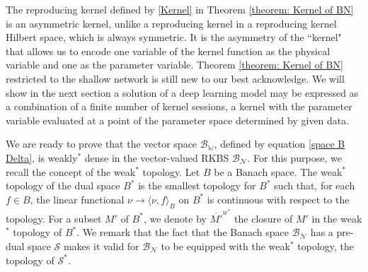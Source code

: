 \documentclass[11pt]{article}
\begin{document}
The reproducing kernel defined by \eqref{Kernel} in Theorem \ref{theorem: Kernel of BN} is an asymmetric kernel, unlike a reproducing kernel in a reproducing kernel Hilbert space, which is always symmetric. It is the asymmetry of the ``kernel" that allows us to encode one variable of the kernel function as the physical variable and one as the parameter variable. Theorem \ref{theorem: Kernel of BN} restricted to the shallow network is still new to our best acknowledge. We will show in the next section a solution of a deep learning model may be expressed as a combination of a finite number of kernel sessions, a kernel with the parameter variable evaluated at a point of the parameter space determined by given data.

We are ready to prove that the vector space $\mathcal{B}_{\mathbb{W}}$, defined by equation \eqref{space B Delta}, is weakly${}^*$ dense in the vector-valued RKBS $\mathcal{B}_{\mathcal{N}}$. For this purpose, we recall the concept of the weak${}^*$ topology. Let $B$ be a Banach space. The weak${}^*$ topology of the dual space $B^{*}$ is the smallest topology for $B^{*}$ such that, for each $f\in B$, the linear functional $\nu \rightarrow\langle\nu, f\rangle_{B}$ on $B^*$ is continuous with respect to the topology. For a subset $M'$ of $B^*$, we denote by $\overline{M'}^{w^*}$ the closure of $M'$ in the weak$^*$ topology of $B^*$. We remark that the fact that the Banach space $\mathcal{B}_{\mathcal{N}}$ has a pre-dual space $\mathcal{S}$ makes it valid for $\mathcal{B}_{\mathcal{N}}$ to be equipped with the weak$^*$ topology, the topology of $\mathcal{S}^*$.
\end{document}
